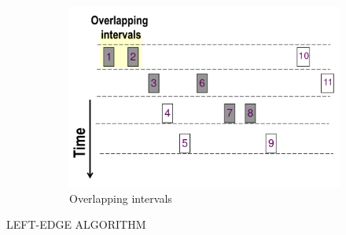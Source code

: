 \begin{figure}[H]
\begin{subfigure}[b]{0.2\textwidth}
        \caption{}
   		\label{fig:alu}
    \end{subfigure}
    \quad\quad\quad
    \begin{subfigure}[b]{0.45\textwidth}
        \includegraphics[width=\textwidth]{./Cap5/Images/Image07.png}
        \caption{Overlapping intervals}
   		\label{fig:Overlapping intervals}
    \end{subfigure}
    \caption{}
\end{figure}

LEFT-EDGE ALGORITHM